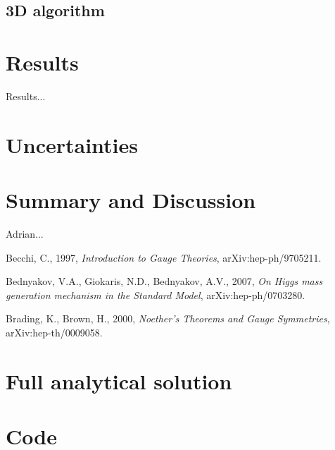 \documentclass[aps,twocolumn,pre,nofootinbib]{revtex4-1}
\begin{document}
\subsection{3D algorithm}






\section{Results \label{sec:res}}


Results...


\section{Uncertainties \label{sec:unc}}




\section{Summary and Discussion \label{sec:sum}}


\begin{acknowledgments}
Adrian...
\end{acknowledgments}

\begin{thebibliography}{5}

 Becchi, C., 1997, \emph{Introduction to Gauge Theories}, arXiv:hep-ph/9705211.

 Bednyakov, V.A., Giokaris, N.D., Bednyakov, A.V., 2007, \emph{On Higgs mass generation mechanism in the Standard Model}, 	arXiv:hep-ph/0703280.

 Brading, K., Brown, H., 2000, \emph{Noether's Theorems and Gauge Symmetries}, arXiv:hep-th/0009058.



\end{thebibliography}



\appendix*
\section{Full analytical solution}
\section{Code}
\end{document}
